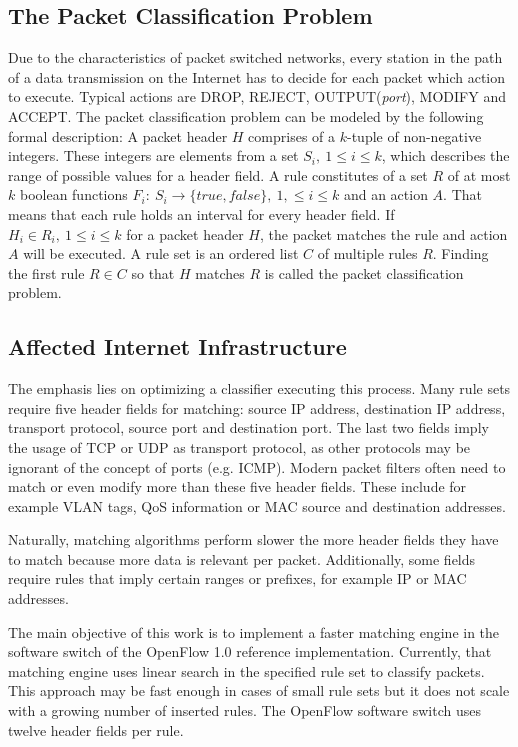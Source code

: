 \documentclass[conference]{IEEEtran}
\begin{document}
\subsection{The Packet Classification Problem}
Due to the characteristics of packet switched networks, every station in the path of a data transmission on the Internet 
has to decide for each packet which action to execute.
Typical actions are DROP, REJECT, OUTPUT(\textit{port}), MODIFY and ACCEPT.
The packet classification problem can be modeled by the following formal description:
A packet header $H$ comprises of a $k$-tuple of non-negative integers.
These integers are elements from a set $S_i,\ 1 \leq i \leq k$, which describes the range of possible values for a header field.
A rule constitutes of a set $R$ of at most $k$ boolean functions
$F_i:\ S_i \rightarrow \{true, false\},\ 1,\leq i \leq k$ and an action $A$.
That means that each rule holds an interval for every header field.
If $H_i \in R_i,\ 1 \leq i \leq k$ for a packet header $H$, the packet matches the rule and action $A$ will be executed.
A rule set is an ordered list $C$ of multiple rules $R$.
Finding the first rule $R \in C$ so that $H$ matches 
$R$ is called the packet classification problem.

\subsection{Affected Internet Infrastructure}
The emphasis lies on optimizing a classifier executing this process.
Many rule sets require five header fields for matching: source 
IP address, destination IP address, transport protocol, source port and destination port.
The last two fields imply the usage of TCP or UDP as transport protocol, 
as other protocols may be ignorant of the concept of ports (e.g. ICMP).
Modern packet filters often need to match or even modify more than these five header fields.
These include for example VLAN tags, QoS information or MAC source and destination addresses.

Naturally, matching algorithms perform slower the more header fields they 
have to match because more data is relevant per packet.
Additionally, some fields require rules that imply certain ranges or prefixes, for example IP or MAC addresses.

The main objective of this work is to implement a faster matching engine in the 
software switch of the OpenFlow 1.0 reference implementation.
Currently, that matching engine uses linear search in the specified rule set to classify packets.
This approach may be fast enough in cases of small rule sets but it does not scale
with a growing number of inserted rules.
The OpenFlow software switch uses twelve header fields per rule.
\end{document}
